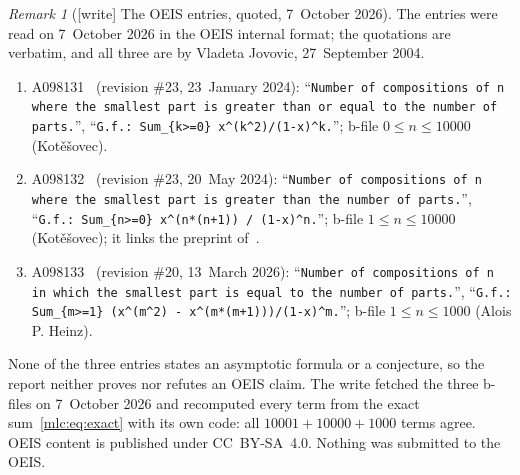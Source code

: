 \documentclass[11pt]{article}
\theoremstyle{remark}\newtheorem{remark}[theorem]{Remark}
\begin{document}
\begin{remark}[{[write]} The OEIS entries, quoted, 7~October 2026]\label{mlc:rem:oeis}
The entries were read on 7~October 2026 in the OEIS internal format; the
quotations are verbatim, and all three are by Vladeta Jovovic, 27~September
2004.
\begin{enumerate}[label=(\alph*)]\raggedright
\item A098131~\cite{oeis131} (revision \#23, 23~January 2024): ``\texttt{Number
 of compositions of n where the smallest part is greater than or equal to the
 number of parts.}'', ``\texttt{G.f.: Sum\_\{k>=0\} x\^{}(k\^{}2)/(1-x)\^{}k.}'';
 b-file $0\le n\le10000$ (Kot\v{e}\v{s}ovec).
\item A098132~\cite{oeis132} (revision \#23, 20~May 2024): ``\texttt{Number of
 compositions of n where the smallest part is greater than the number of
 parts.}'', ``\texttt{G.f.: Sum\_\{n>=0\} x\^{}(n*(n+1)) / (1-x)\^{}n.}''; b-file
 $1\le n\le10000$ (Kot\v{e}\v{s}ovec); it links the preprint of~\cite{chu}.
\item A098133~\cite{oeis133} (revision \#20, 13~March 2026): ``\texttt{Number of
 compositions of n in which the smallest part is equal to the number of
 parts.}'', ``\texttt{G.f.: Sum\_\{m>=1\} (x\^{}(m\^{}2) - x\^{}(m*(m+1)))/(1-x)\^{}m.}'';
 b-file $1\le n\le1000$ (Alois P. Heinz).
\end{enumerate}
None of the three entries states an asymptotic formula or a conjecture, so
the report neither proves nor refutes an OEIS claim. The write fetched the
three b-files on 7~October 2026 and recomputed every term from the exact
sum~\eqref{mlc:eq:exact} with its own code: all $10001+10000+1000$ terms
agree. OEIS content is published under CC~BY-SA~4.0. Nothing was submitted
to the OEIS.
\end{remark}
\end{document}
